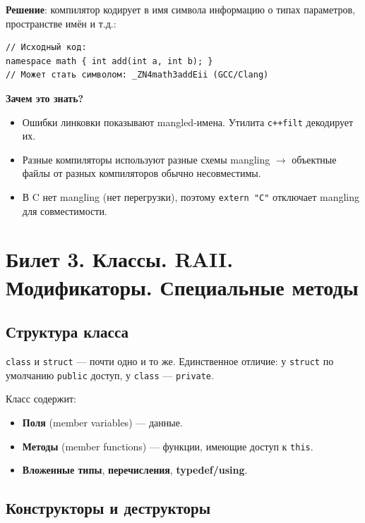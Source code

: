 \documentclass[12pt,a4paper]{article}
\begin{document}
\textbf{Решение}: компилятор кодирует в имя символа информацию о типах параметров, пространстве имён и т.д.:
\begin{lstlisting}
// Исходный код:
namespace math { int add(int a, int b); }
// Может стать символом: _ZN4math3addEii (GCC/Clang)
\end{lstlisting}

\textbf{Зачем это знать?}
\begin{itemize}
    \item Ошибки линковки показывают mangled-имена. Утилита \texttt{c++filt} декодирует их.
    \item Разные компиляторы используют разные схемы mangling $\to$ объектные файлы от разных компиляторов обычно несовместимы.
    \item В C нет mangling (нет перегрузки), поэтому \texttt{extern "C"} отключает mangling для совместимости.
\end{itemize}

\section{Билет 3. Классы. RAII. Модификаторы. Специальные методы}

\subsection{Структура класса}

\texttt{class} и \texttt{struct} --- почти одно и то же. Единственное отличие: у \texttt{struct} по умолчанию \texttt{public} доступ, у \texttt{class} --- \texttt{private}.

Класс содержит:
\begin{itemize}
    \item \textbf{Поля} (member variables) --- данные.
    \item \textbf{Методы} (member functions) --- функции, имеющие доступ к \texttt{this}.
    \item \textbf{Вложенные типы}, \textbf{перечисления}, \textbf{typedef/using}.
\end{itemize}

\subsection{Конструкторы и деструкторы}
\end{document}
